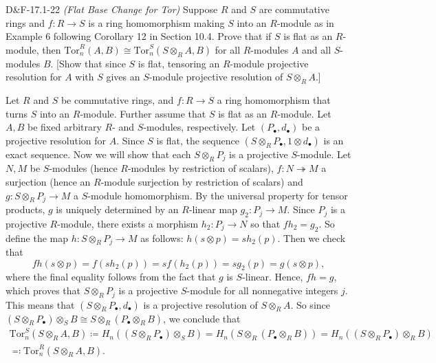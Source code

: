 \documentclass{article}
\newcommand{\tor}{\text{Tor}}
\begin{document}
	\begin{prb}{D\&F-17.1-22}
		\textit{(Flat Base Change for Tor)} Suppose $R$ and $S$ are commutative rings and $f: R \to S$ is a ring homomorphism making $S$ into an $R$-module as in Example 6 following Corollary 12 in Section 10.4. Prove that if $S$ is flat as an $R$-module, then $\tor_{n}^{R}(A,B) \cong \tor_{n}^{S}(S\otimes_{R}A,B)$ for all $R$-modules $A$ and all $S$-modules $B$. [Show that since $S$ is flat, tensoring an $R$-module projective resolution for $A$ with $S$ gives an $S$-module projective resolution of $S\otimes_{R}A$.]
	\end{prb}
	
	Let $R$ and $S$ be commutative rings, and $f: R \to S$ a ring homomorphism that turns $S$ into an $R$-module. Further assume that $S$ is flat as an $R$-module. Let $A, B$ be fixed arbitrary $R$- and $S$-modules, respectively. Let $(P_{\bullet}, d_{\bullet})$ be a projective resolution for $A$. Since $S$ is flat, the sequence $(S \otimes_{R} P_{\bullet}, 1 \otimes d_{\bullet})$ is an exact sequence. Now we will show that each $S \otimes_{R} P_{j}$ is a projective $S$-module. Let $N, M$ be $S$-modules (hence $R$-modules by restriction of scalars), $f: N \twoheadrightarrow M$ a surjection (hence an $R$-module surjection by restriction of scalars) and $g: S \otimes_{R}P_{j} \to M$ a $S$-module homomorphism. By the universal property for tensor products, $g$ is uniquely determined by an $R$-linear map $g_{2}: P_{j} \to M$. Since $P_{j}$ is a projective $R$-module, there exists a morphism $h_{2}: P_{j} \to N$ so that  $fh_{2} = g_{2}$. So define the map $h: S \otimes_{R} P_{j} \to M$ as follows: $h(s \otimes p) = sh_{2}(p)$. Then we check that 
	\begin{equation*}
		fh(s \otimes p) = f(sh_{2}(p)) = sf(h_{2}(p)) = sg_{2}(p) = g(s \otimes p), 
	\end{equation*}
	where the final equality follows from the fact that $g$ is $S$-linear. Hence, $fh = g$, which proves that $S \otimes_{R} P_{j}$ is a projective $S$-module for all nonnegative integers $j$. This means that $(S \otimes_{R} P_{\bullet}, d_{\bullet})$ is a projective resolution of $S \otimes_{R} A$. So since $(S \otimes_{R} P_{\bullet}) \otimes_{S} B \cong S \otimes_{R}(P_{\bullet} \otimes_{R} B)$, we conclude that 
	\begin{multline*}
		\tor_{n}^{S}(S \otimes_{R} A, B) \coloneqq H_{n}((S \otimes_{R}P_{\bullet}) \otimes_{S} B) = H_{n}(S \otimes_{R}(P_{\bullet} \otimes_{R} B)) = H_{n}((S \otimes_{R}P_{\bullet}) \otimes_{R}B) \\ \eqqcolon \tor_{n}^{R}(S \otimes_{R} A, B). 
	\end{multline*}
	
\end{document}
